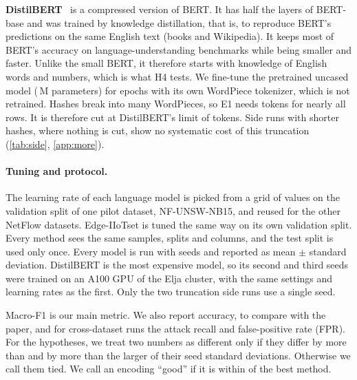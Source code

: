 \textbf{DistilBERT}~\cite{sanh2019distilbert} is a compressed version of BERT. It has half the layers of BERT-base and
was trained by knowledge distillation, that is, to reproduce BERT's predictions on the same English text (books and
Wikipedia). It keeps most of BERT's accuracy on language-understanding benchmarks while being smaller and faster.
Unlike the small BERT, it therefore starts with knowledge of English words and numbers, which is what H4 tests. We
fine-tune the pretrained uncased model (\,M parameters) for
 epochs with its own WordPiece tokenizer, which is not retrained. Hashes break into many WordPieces, so E1
needs  tokens for nearly all rows. It is
therefore cut at DistilBERT's limit of  tokens. Side runs with shorter
hashes, where nothing is cut, show no systematic cost of this truncation (\cref{tab:side}, \cref{app:more}).

\paragraph{Tuning and protocol.} The learning rate of each language model is picked from a grid of
 values on the validation split of one pilot dataset, NF-UNSW-NB15, and
reused for the other NetFlow datasets. Edge-IIoTset is tuned the same way on its own validation split.
Every method sees the same samples, splits and columns, and the test split is used only once. Every model is run
with  seeds and reported as mean $\pm$ standard deviation. DistilBERT is the most expensive
model, so its second and third seeds were trained on an A100 GPU of the Elja cluster, with the same settings and
learning rates as the first. Only the two truncation side runs use a single seed.

Macro-F1 is our main metric. We also report accuracy, to compare with the paper, and for cross-dataset runs the
attack recall and false-positive rate (FPR). For the hypotheses, we treat two numbers as different only if they
differ by more than  and by more than the larger of their seed standard
deviations. Otherwise we call them tied. We call an encoding ``good'' if it is within
 of the best method.

